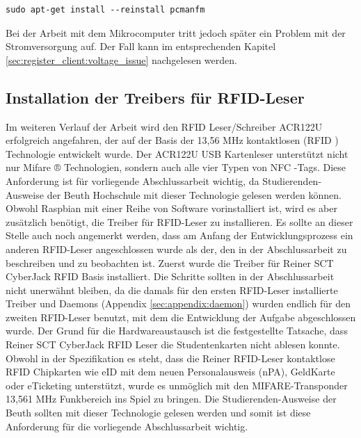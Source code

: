 \begin{lstlisting}[caption={[Boot-Schleife beim Start des der Desktops] },captionpos=b]
sudo apt-get install --reinstall pcmanfm
\end{lstlisting}
Bei der Arbeit mit dem Mikrocomputer tritt jedoch später ein Problem mit der Stromversorgung auf. Der Fall kann im entsprechenden Kapitel \ref{sec:register_client:voltage_issue} nachgelesen werden.


\subsection{Installation der Treibers für RFID-Leser}
\label{sec:register_client:install_rfid}
Im weiteren Verlauf der Arbeit wird den RFID Leser/Schreiber ACR122U erfolgreich angefahren, der auf der Basis der 13,56 MHz kontaktlosen (RFID ) Technologie entwickelt wurde. Der ACR122U USB Kartenleser unterstützt nicht nur Mifare ® Technologien, sondern auch alle vier Typen von NFC -Tags. Diese Anforderung ist für vorliegende Abschlussarbeit wichtig, da Studierenden-Ausweise der Beuth Hochschule mit dieser Technologie gelesen werden können. Obwohl Raspbian mit einer Reihe von Software vorinstalliert ist, wird es aber zusätzlich benötigt, die Treiber für RFID-Leser zu installieren. Es sollte an dieser Stelle auch noch angemerkt werden, dass am Anfang der Entwicklungsprozess ein anderen RFID-Leser angeschlossen wurde als der, den in der Abschlussarbeit zu beschreiben und zu beobachten ist. Zuerst wurde die Treiber für Reiner SCT CyberJack RFID Basis\cite{website:4} installiert. Die Schritte sollten in der Abschlussarbeit nicht unerwähnt bleiben, da die damals für den ersten RFID-Leser installierte Treiber und Daemons (Appendix \ref{sec:appendix:daemon}) wurden endlich für den zweiten RFID-Leser benutzt, mit dem die Entwicklung der Aufgabe abgeschlossen wurde. Der Grund für die Hardwareaustausch ist die festgestellte Tatsache, dass Reiner SCT CyberJack RFID Leser die Studentenkarten nicht ablesen konnte. Obwohl in der Spezifikation es steht, dass die Reiner RFID-Leser kontaktlose RFID Chipkarten wie eID mit dem neuen Personalausweis (nPA), GeldKarte oder eTicketing unterstützt, wurde es unmöglich mit den MIFARE-Transponder 13,561 MHz Funkbereich ins Spiel zu bringen. Die Studierenden-Ausweise der Beuth sollten mit dieser Technologie gelesen werden und somit ist diese Anforderung für die vorliegende Abschlussarbeit wichtig. 

